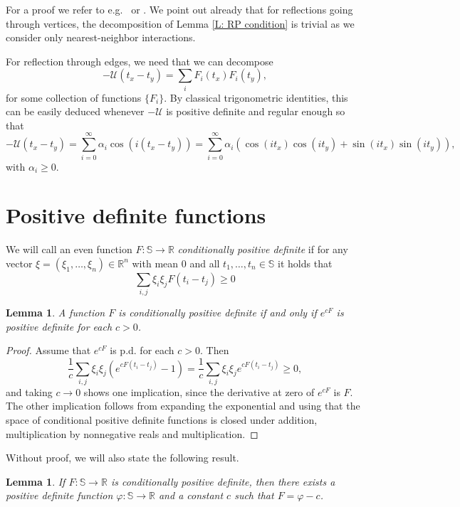 \documentclass[11pt, reqno]{amsart}
\newtheorem{lemma}[theorem]{Lemma}
\numberwithin{equation}{section}
\theoremstyle{definition}
\theoremstyle{remark}
\newcommand{\RR}{\mathbb{R}}
\renewcommand{\c}[1]{\ensuremath{\mathcal{#1}}}
\begin{document}
For a proof we refer to e.g.~\cite{Biskup} or \cite[Lemma 10.8]{FriVel}. 
We point out already that for reflections going through vertices, 
the decomposition of Lemma \ref{L: RP condition} is trivial as we consider only nearest-neighbor interactions. 

For reflection through edges, we need that we can decompose
\[
	-\c{U}(t_x - t_y) = \sum_{i} F_{i}(t_x)F_{i}(t_y), 
\]
for some collection of functions $\{F_{i}\}$. 
By classical trigonometric identities, this can be easily deduced whenever $-\c{U}$ is positive definite and regular enough so that  
\[
	-\c{U}(t_x - t_y) = \sum_{i = 0}^\infty \alpha_i \cos(i(t_x - t_y)) = \sum_{i = 0}^\infty \alpha_i (\cos(it_x)\cos(it_y) + \sin(it_x)\sin(it_y)), 
\]
with $\alpha_i\geq0$.

\section{Positive definite functions} \label{ap:div}
We will call an even function $F:\mathbb{S} \to \RR$ \textit{conditionally positive definite} if for any vector $\xi = (\xi_1, \ldots, \xi_n) \in \RR^n$ with mean $0$ and all $t_1, \ldots, t_n \in \mathbb{S}$ it holds that
\[
	\sum_{i, j} \xi_i\xi_j F(t_i - t_j) \geq 0
\]
\begin{lemma}
	A function $F$ is conditionally positive definite if and only if $e^{cF}$ is positive definite for each $c > 0$. 
\end{lemma}
\begin{proof}
	Assume that $e^{cF}$ is p.d. for each $c > 0$. Then
	\[
		\frac{1}{c} \sum_{i, j} \xi_i\xi_j (e^{cF(t_i - t_j)} - 1) = \frac{1}{c} \sum_{i, j} \xi_i\xi_j e^{cF(t_i - t_j)}  \geq 0, 
	\]
	and taking $c \to 0$ shows one implication, since the derivative at zero of $e^{cF}$ is $F$. 
	The other implication follows from expanding the exponential and using that the space of conditional positive definite functions is closed under addition, 
	multiplication by nonnegative reals and multiplication. 
\end{proof}

Without proof, we will also state the following result. 

\begin{lemma} \label{L: cond PD -> PD}
	If $F:\mathbb{S} \to \RR$ is conditionally positive definite, then there exists a positive definite function $\varphi:\mathbb{S} \to \RR$ and a constant $c$ such that $F = \varphi - c$. 
\end{lemma}
\end{document}
